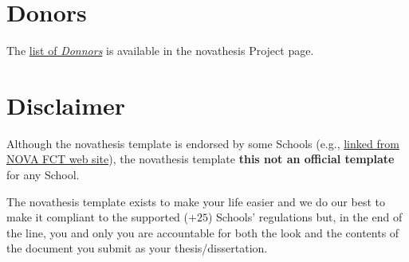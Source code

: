 



\section{Donors}
\label{sec:donations}

\ntindex[Donations]{}

The \href{https://github.com/joaomlourenco/novathesis/wiki#donators}{list of \emph{Donnors}} is available in the \gls{novathesis} Project page.


\section{Disclaimer}
\label{sec:disclaimer}

\ntindex[Disclaimer]{}

Although the \gls{novathesis} template is endorsed by some Schools (e.g., \href{https://www.fct.unl.pt/estudante/informacao-academica/teses-e-dissertacoes}{linked from NOVA FCT web site}), the \gls{novathesis} template \textbf{this not an official template} for any School.

The \gls{novathesis} template exists to make your life easier and we do our best to make it compliant to the supported ($+25$) Schools' regulations but, in the end of the line, you and only you are accountable for both the look and the contents of the document you submit as your thesis/dissertation.

